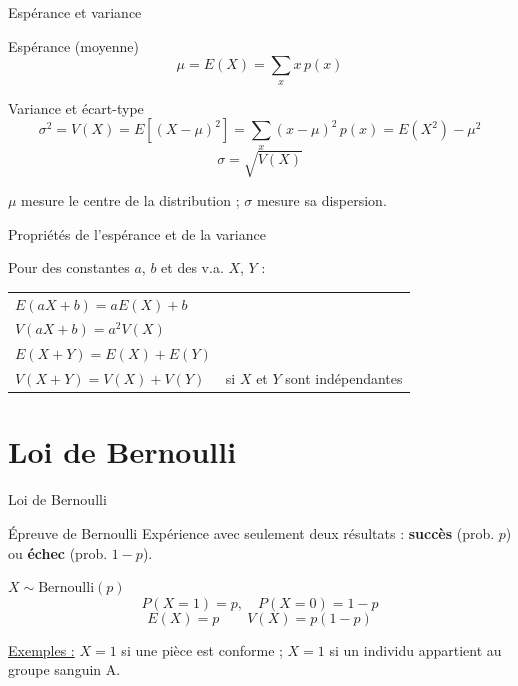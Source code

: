 \documentclass{BeamerTemplate}
\begin{document}
\begin{frame}[t]{Espérance et variance}

\begin{Boite}{Espérance (moyenne)}
$$\mu = E(X) = \sum_x x\, p(x)$$
\end{Boite}

\begin{Boite}{Variance et écart-type}
$$\sigma^2 = V(X) = E\!\left[(X-\mu)^2\right] = \sum_x (x-\mu)^2\, p(x) = E(X^2) - \mu^2$$
$$\sigma = \sqrt{V(X)}$$
\end{Boite}

\medskip
$\mu$ mesure le \alert{centre} de la distribution ; $\sigma$ mesure sa \alert{dispersion}.

\end{frame}

\begin{frame}[t]{Propriétés de l'espérance et de la variance}

Pour des constantes $a$, $b$ et des v.a. $X$, $Y$ :

\bigskip
\begin{center}
\begin{tabular}{ll}
$E(aX + b) = a E(X) + b$ & \\[6pt]
$V(aX + b) = a^2 V(X)$ & \\[6pt]
$E(X + Y) = E(X) + E(Y)$ & \\[6pt]
$V(X + Y) = V(X) + V(Y)$ & si $X$ et $Y$ sont \alert{indépendantes}
\end{tabular}
\end{center}

\end{frame}

\section{Loi de Bernoulli}

\begin{frame}[t]{Loi de Bernoulli}

\begin{Boite}{Épreuve de Bernoulli}
Expérience avec seulement deux résultats : \textbf{succès} (prob. $p$) ou \textbf{échec} (prob. $1-p$).
\end{Boite}

\begin{Boite}{$X \sim \text{Bernoulli}(p)$}
$$P(X=1) = p, \quad P(X=0) = 1-p$$
$$E(X) = p \qquad V(X) = p(1-p)$$
\end{Boite}

\medskip
\underline{Exemples :} $X = 1$ si une pièce est conforme ; $X = 1$ si un individu appartient au groupe sanguin A.

\end{frame}
\end{document}
